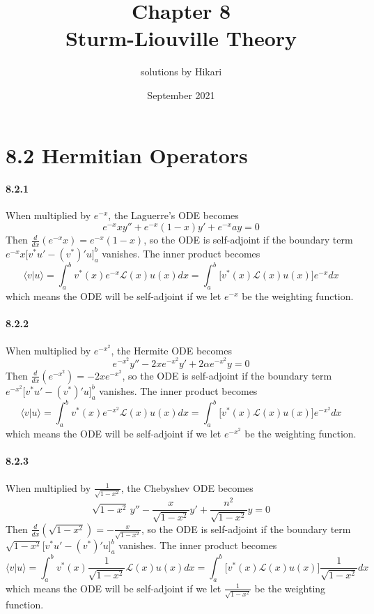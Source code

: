 \documentclass[a4paper]{article}
\title{Chapter 8\\Sturm-Liouville Theory}
\author{solutions by Hikari}
\date{September 2021}
\begin{document}
\newcommand{\pdv}[2]{\frac{\partial#1}{\partial#2}}
\newcommand{\V}{\mathbf}
\newcommand{\M}{\mathrm}
\newcommand{\VE}{\hat{\V{e}}}
\newcommand{\br}[2]{\langle#1|#2\rangle}

\maketitle

\section*{8.2 Hermitian Operators}

\paragraph{8.2.1}
When multiplied by $e^{-x}$, the Laguerre’s ODE becomes
\[
e^{-x}xy''+e^{-x}(1-x)y'+e^{-x}ay=0
\]
Then $\frac{d}{dx}(e^{-x}x)=e^{-x}(1-x)$, so the ODE is self-adjoint if the boundary term $e^{-x}x\big[v^*u'-(v^*)'u\big]_a^b$ vanishes. 
The inner product becomes 
\[
\br{v}{u}=\int_a^bv^*(x)e^{-x}\mathcal{L}(x)u(x)dx=\int_a^b\big[v^*(x)\mathcal{L}(x)u(x)\big]e^{-x}dx
\]
which means the ODE will be self-adjoint if we let $e^{-x}$ be the weighting function.

\paragraph{8.2.2}
When multiplied by $e^{-x^2}$, the Hermite ODE becomes
\[
e^{-x^2}y''-2xe^{-x^2}y'+2\alpha e^{-x^2}y=0
\]
Then $\frac{d}{dx}(e^{-x^2})=-2xe^{-x^2}$, so the ODE is self-adjoint if the boundary term $e^{-x^2}\big[v^*u'-(v^*)'u\big]_a^b$ vanishes. 
The inner product becomes 
\[
\br{v}{u}=\int_a^bv^*(x)e^{-x^2}\mathcal{L}(x)u(x)dx=\int_a^b\big[v^*(x)\mathcal{L}(x)u(x)\big]e^{-x^2}dx
\]
which means the ODE will be self-adjoint if we let $e^{-x^2}$ be the weighting function.

\paragraph{8.2.3}
When multiplied by $\frac{1}{\sqrt{1-x^2}}$, the Chebyshev ODE becomes
\[
\sqrt{1-x^2}\,y''-\frac{x}{\sqrt{1-x^2}}y'+\frac{n^2}{\sqrt{1-x^2}}y=0
\]
Then $\frac{d}{dx}(\sqrt{1-x^2})=-\frac{x}{\sqrt{1-x^2}}$, so the ODE is self-adjoint if the boundary term $\sqrt{1-x^2}\big[v^*u'-(v^*)'u\big]_a^b$ vanishes. 
The inner product becomes 
\[
\br{v}{u}=\int_a^bv^*(x)\frac{1}{\sqrt{1-x^2}}\mathcal{L}(x)u(x)dx=\int_a^b\big[v^*(x)\mathcal{L}(x)u(x)\big]\frac{1}{\sqrt{1-x^2}}dx
\]
which means the ODE will be self-adjoint if we let $\frac{1}{\sqrt{1-x^2}}$ be the weighting function.
\end{document}
